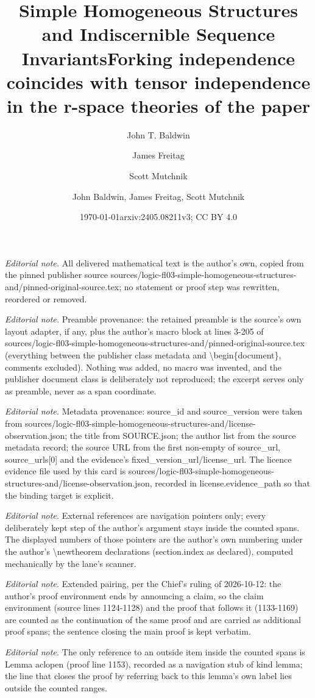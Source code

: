 \documentclass[10pt,a4paper]{amsart}
\title{Simple Homogeneous Structures and Indiscernible Sequence Invariants}
\author[1]{John T. Baldwin}
\author[2]{James Freitag}
\author[3]{Scott Mutchnik}
\date{\today}
\title{Forking independence coincides with tensor independence in the r-space theories of the paper}
\author{John Baldwin, James Freitag, Scott Mutchnik}
\date{arxiv:2405.08211v3; CC BY 4.0}
\theoremstyle{definition}
\theoremstyle{remark}
\numberwithin{equation}{section}
\begin{document}
\maketitle
\noindent\textit{Editorial note.} All delivered mathematical text is the author's own, copied from the pinned publisher source sources/logic-fl03-simple-homogeneous-structures-and/pinned-original-source.tex; no statement or proof step was rewritten, reordered or removed.\par\medskip
\noindent\textit{Editorial note.} Preamble provenance: the retained preamble is the source's own layout adapter, if any, plus the author's macro block at lines 3-205 of sources/logic-fl03-simple-homogeneous-structures-and/pinned-original-source.tex (everything between the publisher class metadata and \textbackslash{}begin\{document\}, comments excluded). Nothing was added, no macro was invented, and the publisher document class is deliberately not reproduced; the excerpt serves only as preamble, never as a span coordinate.\par\medskip
\noindent\textit{Editorial note.} Metadata provenance: source\_id and source\_version were taken from sources/logic-fl03-simple-homogeneous-structures-and/license-observation.json; the title from SOURCE.json; the author list from the source metadata record; the source URL from the first non-empty of source\_url, source\_urls[0] and the evidence's fixed\_version\_url/license\_url. The licence evidence file used by this card is sources/logic-fl03-simple-homogeneous-structures-and/license-observation.json, recorded in license.evidence\_path so that the binding target is explicit.\par\medskip
\noindent\textit{Editorial note.} External references are navigation pointers only; every deliberately kept step of the author's argument stays inside the counted spans. The displayed numbers of those pointers are the author's own numbering under the author's \textbackslash{}newtheorem declarations (section.index as declared), computed mechanically by the lane's scanner.\par\medskip
\noindent\textit{Editorial note.} Extended pairing, per the Chief's ruling of 2026-10-12: the author's proof environment ends by announcing a claim, so the claim environment (source lines 1124-1128) and the proof that follows it (1133-1169) are counted as the continuation of the same proof and are carried as additional proof spans; the sentence closing the main proof is kept verbatim.\par\medskip
\noindent\textit{Editorial note.} The only reference to an outside item inside the counted spans is Lemma aclopen (proof line 1153), recorded as a navigation stub of kind lemma; the line that closes the proof by referring back to this lemma's own label lies outside the counted ranges.\par\medskip
\end{document}
